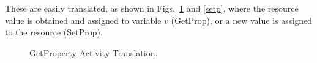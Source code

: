 \begin{itemize}
These are easily translated, as shown in Figs.~\ref{getp} and \ref{setp}, where the resource value is obtained and assigned to variable $v$ (GetProp), or a new value is assigned to the resource (SetProp).
\vspace{-0.8cm}
\begin{figure}[!ht]
\begin{center}
\end{center}
\vspace{-0.7cm}
\caption{\label{getp} GetProperty Activity Translation.}
\vspace{-0.7cm}
\end{figure}
\vspace{-0.1cm}
%
\begin{figure}[!ht]
\begin{center}
\end{center}
\end{figure}
\end{itemize}
